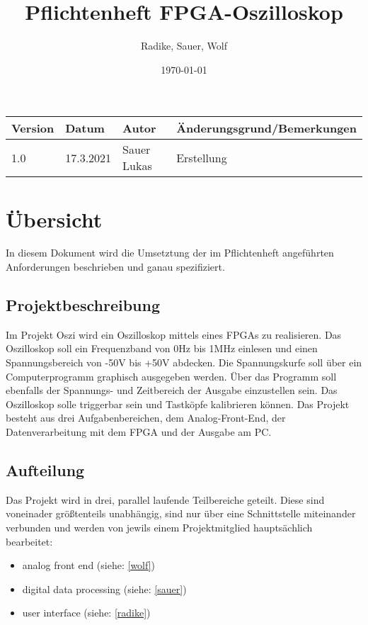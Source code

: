 \documentclass{scrartcl}
\begin{document}
\title{Pflichtenheft FPGA-Oszilloskop}
\author{Radike, Sauer, Wolf}
\date{\today}
\maketitle
\begin{tabular}[h]{l|l|l|l} %
		Version & Datum & Autor & Änderungsgrund/Bemerkungen\\
		\hline
		1.0 & 17.3.2021 & Sauer Lukas & Erstellung
\end{tabular}
\tableofcontents 
\newpage

\section{Übersicht}
In diesem Dokument wird die Umsetztung der im Pflichtenheft angeführten Anforderungen beschrieben und ganau spezifiziert. 
\subsection{Projektbeschreibung}
Im Projekt Oszi wird ein Oszilloskop mittels eines FPGAs zu realisieren. Das Oszilloskop soll ein Frequenzband von 0Hz bis 1MHz einlesen und einen Spannungsbereich von -50V bis +50V abdecken. Die Spannungskurfe soll über ein Computerprogramm graphisch ausgegeben werden. Über das Programm soll ebenfalls der Spannungs- und Zeitbereich der Ausgabe einzustellen sein. Das Oszilloskop solle triggerbar sein und Tastköpfe kalibrieren können. Das Projekt besteht aus drei Aufgabenbereichen, dem Analog-Front-End, der Datenverarbeitung mit dem FPGA und der Ausgabe am PC.

\subsection{Aufteilung}
Das Projekt wird in drei, parallel laufende Teilbereiche geteilt. Diese sind voneinader größtenteils unabhängig, sind nur über eine Schnittstelle miteinander verbunden und werden von jewils einem Projektmitglied hauptsächlich bearbeitet:
\begin{itemize}
\item analog front end (siehe: \ref{wolf})
\item digital data processing (siehe: \ref{sauer})
\item user interface (siehe: \ref{radike})
\end {itemize}





\end{document}
